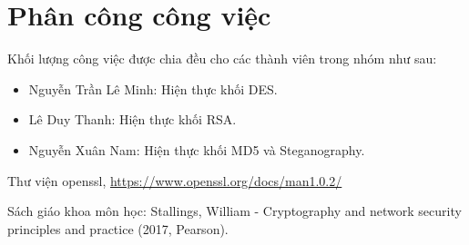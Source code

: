 \documentclass[a4paper]{article}
\begin{document}
\section{Phân công công việc}
Khối lượng công việc được chia đều cho các thành viên trong nhóm như sau:
\begin{itemize}
    \item Nguyễn Trần Lê Minh: Hiện thực khối DES.
    \item Lê Duy Thanh: Hiện thực khối RSA.
    \item Nguyễn Xuân Nam: Hiện thực khối MD5 và Steganography.
\end{itemize}

\newpage
\begin{thebibliography}{80}


Thư viện openssl, \url{https://www.openssl.org/docs/man1.0.2/}


Sách giáo khoa môn học: Stallings, William - Cryptography and network security principles and practice (2017, Pearson).


\end{thebibliography}
\end{document}
